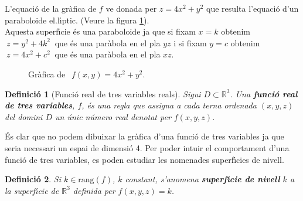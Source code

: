 \documentclass[12pt]{article}
\newcommand{\solucio}{\textbf{Soluci{\'o}}\ \ }
\newtheorem{definicio}{Definici{\'o}}[subsection]
\newtheorem{exemple}{Exemple}[subsection]
\newcommand{\R}{\mathbb{R}}
\begin{document}
\begin{itemize}
L'equaci{\'o} de la gr{\`a}fica de $f$ ve donada per $z=4x^2 + y^2$ que resulta
l'equaci{\'o} d'un paraboloide el.l{\'\i}ptic. (Veure la figura \ref{paraboloide}).\\

Aquesta superf{\'\i}cie {\'e}s una paraboloide ja que si fixam $x=k$ obtenim  $\ z=y^2+4k^2\ $ que {\'e}s una par{\`a}bola en el pla $yz$ i si fixam $y=c$ obtenim  $\ z=4x^2+c^2\ $ que {\'e}s una par{\`a}bola en el pla $xz$.
\begin{figure}[h!]
\begin{center}
\end{center}\caption{Gr{\`a}fica de  $\ \ f(x,y)= 4x^2 + y^2$.}\label{paraboloide}
\end{figure}
\end{itemize}


\vspace{1cm}
\begin{definicio}[Funci{\'o} real de tres variables reals]
Sigui $D\subset \R^3$. Una \textbf{funci{\'o} real de tres variables}, $f$, {\'e}s
una regla que assigna a cada terna ordenada $(x,y,z)$ del domini $
D$ un {\'u}nic n{\'u}mero real denotat per $f(x,y,z)$.
\end{definicio}


{\'E}s clar que no podem dibuixar la gr{\`a}fica d'una funci{\'o} de
tres variables ja que seria necessari un espai de dimensi{\'o} 4.
Per poder intuir el comportament d'una funci{\'o} de tres variables,
es poden estudiar les nomenades superf{\'\i}cies de nivell.

\vspace{0.4cm}
\begin{definicio}
Si $k\in \mbox{rang}(f)$, $k$ constant, s'anomena \textbf{superf{\'\i}cie
de nivell} $k$ a la superf{\'\i}cie de $\R^3$ definida per
$f(x,y,z)=k$.
\end{definicio}

%
%
\end{document}
